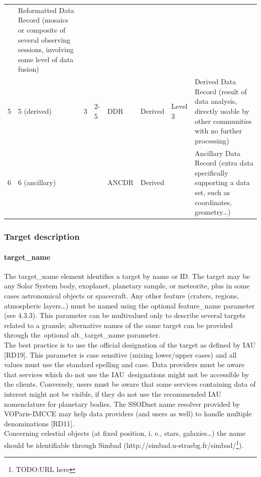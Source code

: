 \documentclass[11pt,a4paper]{ivoa}
\begin{document}
\begin{tabular}{llllllll}
&Reformatted Data Record  (mosaics or composite of several observing sessions, involving some level of data fusion)

\\
5 

&5  (derived)

&3

&2-5

&DDR

&Derived&Level 3

&Derived Data Record  (result of data analysis, directly usable by other communities with no further processing)

\\
6 

&6  (ancillary)

& 

& 

&ANCDR

&Derived& 

&Ancillary Data Record  (extra data specifically supporting a data set, such as coordinates, geometry…) 

\\
\end{tabular}

\subsubsection{Target description}

\paragraph{target\_name}

The target\_name element identifies a target by name or ID. The target may be any Solar System body, exoplanet, planetary sample, or meteorite, plus in some cases astronomical objects or spacecraft. Any other feature (craters, regions, atmospheric layers…) must be named using the optional feature\_name parameter (see 4.3.3). This parameter can be multivalued only to describe several targets related to a granule; alternative names of the same target can be provided through the optional alt\_target\_name parameter.\\ The best practice is to use the official designation of the target as defined by IAU [RD19]. This parameter is case sensitive (mixing lower/upper cases) and all values must use the standard spelling and case. Data providers must be aware that services which do not use the IAU designations might not be accessible by the clients. Conversely, users must be aware that some services containing data of interest might not be visible, if they do not use the recommended IAU nomenclature for planetary bodies. The SSODnet name resolver provided by VOParis-IMCCE may help data providers (and users as well) to handle multiple denominations [RD11].\\Concerning celestial objects (at fixed position, i. e., stars, galaxies…) the name should be identifiable through Simbad (http://simbad.u-strasbg.fr/simbad/\footnote{TODO:URL here}).
\end{document}
